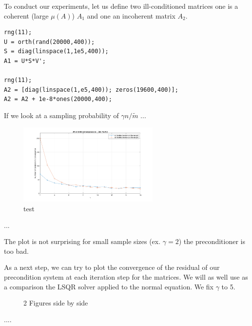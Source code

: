 \documentclass{article}
\begin{document}
To conduct our experiments, let us define two ill-conditioned matrices one is a coherent (large $\mu(A)$)
$A_1$ and one an incoherent matrix $A_2$.

\begin{verbatim}
rng(11);
U = orth(rand(20000,400));
S = diag(linspace(1,1e5,400));
A1 = U*S*V';

rng(11);
A2 = [diag(linspace(1,e5,400)); zeros(19600,400)];
A2 = A2 + 1e-8*ones(20000,400);
\end{verbatim}

If we look at a sampling probability of $\gamma n/\tilde{m}$ ...

\begin{figure}[ht]
	\center
	\includegraphics[width=7cm]{part_e}
	\caption{test}
\end{figure}

...

The plot is not surprising for small sample sizes (ex. $\gamma = 2$) the preconditioner is too bad.  

As a next step, we can try to plot the convergence of the residual of our
precondition system at each iteration step for the matrices. We will as well
use as a comparison the LSQR solver applied to the normal equation. We fix
$\gamma$ to 5. 

\begin{figure}[ht]
	\centering
	\qquad
	\caption{2 Figures side by side}%
	\label{fig:example}
\end{figure}

....

 

\end{document}
